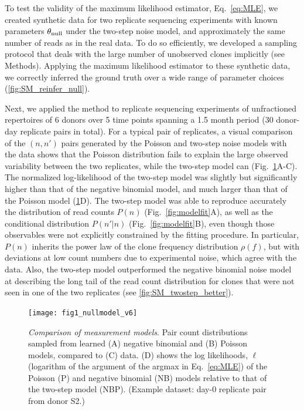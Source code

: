 

To test the validity of the maximum likelihood estimator, Eq.~\ref{eq:MLE}, we created synthetic data for two replicate sequencing experiments with known parameters $\theta_{\rm null}$ under the two-step noise model, and approximately the same number of reads as in the real data.
To do so efficiently, we developed a sampling protocol that deals with the large number of unobserved clones implicitly (see Methods).
Applying the maximum likelihood estimator to these synthetic data, we correctly inferred the ground truth over a wide range of parameter choices (\cref{fig:SM_reinfer_null}).


Next, we applied the method to replicate sequencing experiments of unfractioned repertoires of 6 donors over 5 time points spanning a 1.5 month period (30 donor-day replicate pairs in total). For a typical pair of replicates, a visual comparison of the $(n,n')$ pairs generated by the Poisson and two-step noise models with the data shows that the Poisson distribution fails to explain the large observed variability between the two replicates, while the two-step model can (Fig.~\ref{fig:nullstats}A-C). The normalized log-likelihood of the two-step model was slightly but significantly higher than that of the negative binomial model, and much larger than that of the Poisson model (\cref{fig:nullstats}D). The two-step model was able to reproduce accurately the distribution of read counts $P(n)$ (Fig.~\ref{fig:modelfit}A), as well as the conditional distribution $P(n'|n)$ (Fig.~\ref{fig:modelfit}B), even though those observables were not explicitly constrained by the fitting procedure. In particular, $P(n)$ inherits the power law of the clone frequency distribution $\rho(f)$, but with deviations at low count numbers due to experimental noise, which agree with the data. 
Also, the two-step model outperformed the negative binomial noise model at describing the long tail of the read count distribution for clones that were not seen in one of the two replicates (see \cref{fig:SM_twostep_better}). 


\begin{figure}
\texttt{[image: fig1\_nullmodel\_v6]}
\centering{}
\caption{
  \emph{Comparison of measurement models}. Pair count distributions sampled from learned (A) negative binomial and (B) Poisson models, compared to (C) data. (D) shows the log likelihoods, $\ell$ (logarithm of the argument of the argmax in Eq.~\ref{eq:MLE}) of the Poisson (P) and negative binomial (NB) models relative to that of the two-step model (NBP). (Example dataset: day-0 replicate pair from donor S2.)  \label{fig:nullstats}
  }
\end{figure}

